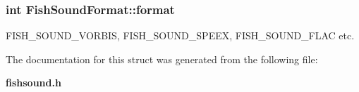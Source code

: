 \subsubsection[{format}]{\setlength{\rightskip}{0pt plus 5cm}int Fish\-Sound\-Format\-::format}\label{structFishSoundFormat_ad8e6fadc27abace836321a7f92971c2b}


F\-I\-S\-H\-\_\-\-S\-O\-U\-N\-D\-\_\-\-V\-O\-R\-B\-I\-S, F\-I\-S\-H\-\_\-\-S\-O\-U\-N\-D\-\_\-\-S\-P\-E\-E\-X, F\-I\-S\-H\-\_\-\-S\-O\-U\-N\-D\-\_\-\-F\-L\-A\-C etc. 



The documentation for this struct was generated from the following file\-:\begin{DoxyCompactItemize}
\item 
{\bf fishsound.\-h}\end{DoxyCompactItemize}
